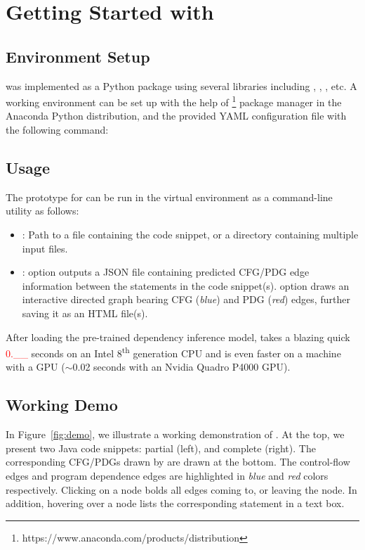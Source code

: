 

\section{Getting Started with \tool}
\subsection{Environment Setup}
\tool was implemented as a Python package using 
several libraries including , , ,
etc. A working environment can be set up with the help of 
\footnote{https://www.anaconda.com/products/distribution} package manager in the Anaconda Python distribution, 
and the provided YAML configuration file with the following 
command: 

\subsection{Usage}
The prototype for \tool can be run in the virtual environment as a command-line utility as follows:

\noindent {}
\begin{itemize}
    \item {}: Path to a  file containing the code snippet, or a directory containing multiple input  files. 
    \item {}:  option outputs a JSON file containing predicted CFG/PDG edge information between the statements in the code snippet(s).  option draws an interactive directed graph bearing CFG (\textit{blue}) and PDG (\textit{red}) edges, further saving it as an HTML file(s). 
\end{itemize}

After loading the pre-trained dependency inference model, \tool takes a blazing quick \textcolor{red}{0.\_\_} seconds on an Intel 8\textsuperscript{th} generation CPU and is even faster on a machine with a GPU ($\sim$0.02 seconds with an Nvidia Quadro P4000 GPU).

\subsection{Working Demo}
In Figure~\ref{fig:demo}, we illustrate a working demonstration of \tool. At the top, we present two Java code snippets: partial (left), and complete (right). The corresponding CFG/PDGs drawn by \tool are drawn at the bottom. The control-flow edges and program dependence edges are highlighted in \textit{blue} and \textit{red} colors respectively. Clicking on a node bolds all edges coming to, or leaving the node. In addition, hovering over a node lists the corresponding statement in a text box.

